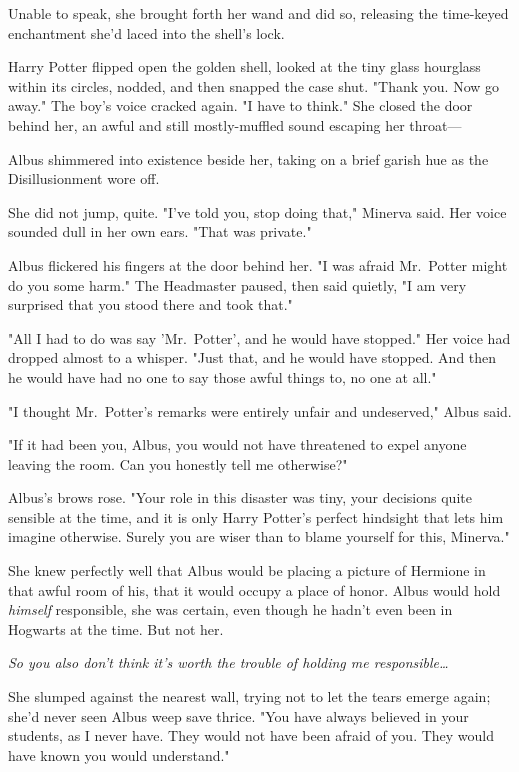 Unable to speak, she brought forth her wand and did so, releasing the 
time-keyed enchantment she'd laced into the shell's lock.

Harry Potter flipped open the golden shell, looked at the tiny glass hourglass 
within its circles, nodded, and then snapped the case shut. "Thank you. Now go 
away." The boy's voice cracked again. "I have to think."
\sbreak
She closed the door behind her, an awful and still mostly-muffled sound 
escaping her throat---

Albus shimmered into existence beside her, taking on a brief garish hue as the 
Disillusionment wore off.

She did not jump, quite. "I've told you, stop doing that," Minerva said. Her 
voice sounded dull in her own ears. "That was private."

Albus flickered his fingers at the door behind her. "I was afraid Mr.~Potter 
might do you some harm." The Headmaster paused, then said quietly, "I am very 
surprised that you stood there and took that."

"All I had to do was say 'Mr.~Potter', and he would have stopped." Her voice 
had dropped almost to a whisper. "Just that, and he would have stopped. And 
then he would have had no one to say those awful things to, no one at all."

"I thought Mr.~Potter's remarks were entirely unfair and undeserved," Albus 
said.

"If it had been you, Albus, you would not have threatened to expel anyone 
leaving the room. Can you honestly tell me otherwise?"

Albus's brows rose. "Your role in this disaster was tiny, your decisions quite 
sensible at the time, and it is only Harry Potter's perfect hindsight that lets 
him imagine otherwise. Surely you are wiser than to blame yourself for this, 
Minerva."

She knew perfectly well that Albus would be placing a picture of Hermione in 
that awful room of his, that it would occupy a place of honor. Albus would hold 
\emph{himself} responsible, she was certain, even though he hadn't even been in 
Hogwarts at the time. But not her.

\emph{So you also don't think it's worth the trouble of holding me 
responsible{\ldots}}

She slumped against the nearest wall, trying not to let the tears emerge again; 
she'd never seen Albus weep save thrice. "You have always believed in your 
students, as I never have. They would not have been afraid of you. They would 
have known you would understand."

